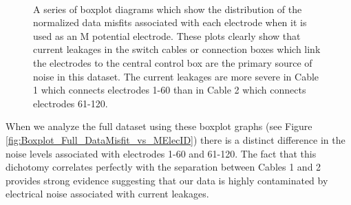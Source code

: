 \documentclass[final,authoryear,5p,times,twocolumn]{elsarticle}
\begin{document}
\begin{figure} [!ht]
\begin{center}
{       } \\%
    \end{center}
\caption{A series of boxplot diagrams which show the distribution of the normalized data misfits associated with each electrode when it is used as an M potential electrode. These plots clearly show that current leakages in the switch cables or connection boxes which link the electrodes to the central control box are the primary source of noise in this dataset. The current leakages are more severe in Cable 1 which connects electrodes 1-60 than in Cable 2 which connects electrodes 61-120.}
\label{fig:Boxplot_Misfit_vs_M_ElecID}
\end{figure}

When we analyze the full dataset using these boxplot graphs (see Figure \ref{fig:Boxplot_Full_DataMisfit_vs_MElecID}) there is a distinct difference in the noise levels associated with electrodes 1-60 and 61-120. The fact that this dichotomy correlates perfectly with the separation between Cables 1 and 2 provides strong evidence suggesting that our data is highly contaminated by electrical noise associated with current leakages. 
\end{document}

